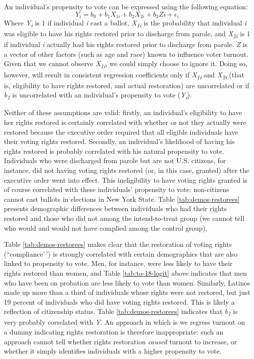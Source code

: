 \documentclass[
  12pt,
]{article}
\begin{document}
An individual's propensity to vote can be expressed using the following equation:
\[ Y_i =  b_0 + b_{1}X_{1i} + b_{2}X_{2i} + b_{3}Z{i}+ \epsilon_{i} \]
Where \emph{Y\textsubscript{i}} is 1 if individual \emph{i} cast a ballot, \emph{X\textsubscript{1i}} is the probability that individual \emph{i} was eligible to have his rights restored prior to discharge from parole, and \emph{X\textsubscript{2i}} is 1 if individual \emph{i} actually had his rights restored prior to discharge from parole. \emph{Z} is a vector of other factors (such as age and race) known to influence voter turnout. Given that we cannot observe \emph{X\textsubscript{1i}}, we could simply choose to ignore it. Doing so, however, will result in consistent regression coefficients only if \emph{X\textsubscript{1i}} and \emph{X\textsubscript{2i}} (that is, eligibility to have rights restored, and actual restoration) are uncorrelated or if \emph{b\textsubscript{1}} is uncorrelated with an individual's propensity to vote (\emph{Y\textsubscript{i}}).

Neither of these assumptions are valid: firstly, an individual's eligibility to have her rights restored is certainly correlated with whether or not they actually were restored because the executive order required that all eligible individuals have their voting rights restored. Secondly, an individual's likelihood of having his rights restored is probably correlated with his natural propensity to vote. Individuals who were discharged from parole but are not U.S. citizens, for instance, did not having voting rights restored (or, in this case, granted) after the executive order went into effect. This ineligibility to have voting rights granted is of course correlated with these individuals' propensity to vote: non-citizens cannot cast ballots in elections in New York State. Table \ref{tab:demos-restorees} presents demographic differences between individuals who had their rights restored and those who did not among the intend-to-treat group (we cannot tell who would and would not have complied among the control group).



Table \ref{tab:demos-restorees} makes clear that the restoration of voting rights (``compliance'\,') is strongly correlated with certain demographics that are also linked to propensity to vote. Men, for instance, were less likely to have their rights restored than women, and Table \ref{tab:to-18-logit} above indicates that men who have been on probation are less likely to vote than women. Similarly, Latinos made up more than a third of individuals whose rights were not restored, but just 19 percent of individuals who did have voting rights restored. This is likely a reflection of citizenship status. Table \ref{tab:demos-restorees} indicates that \emph{b\textsubscript{1}} is very probably correlated with \emph{Y}. An approach in which is we regress turnout on a dummy indicating rights restoration is therefore inappropriate: such an approach cannot tell whether rights restoration \emph{caused} turnout to increase, or whether it simply identifies individuals with a higher propensity to vote.
\end{document}

